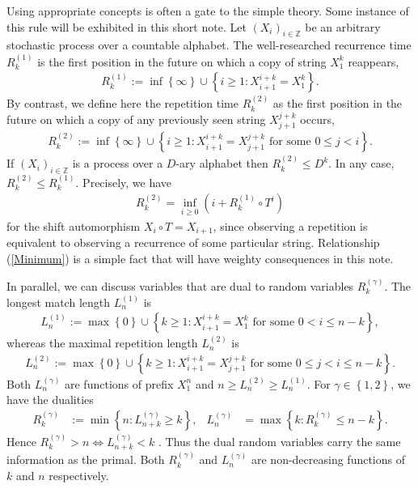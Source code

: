 \documentclass[a4paper]{article}
\newcommand{\okra}[1]{\left( #1 \right)}
\newcommand{\klam}[1]{\left\{ #1 \right\}}
\begin{document}
Using appropriate concepts is often a gate to the simple theory. Some
instance of this rule will be exhibited in this short note.  Let
$(X_i)_{i\in\mathbb{Z}}$ be an arbitrary stochastic process over a
countable alphabet. The well-researched recurrence time $R^{(1)}_k$
\citep{Kac47,WynerZiv89,OrnsteinWeiss93,Kontoyiannis98,Ko12} is the
first position in the future on which a copy of string $X_1^k$
reappears,
\begin{align}
  R^{(1)}_k:=\inf\klam{\infty}\cup\klam{i\ge 1: X_{i+1}^{i+k}=X_1^k}.
\end{align}
By contrast, we define here the repetition time $R^{(2)}_k$ as the
first position in the future on which a copy of any previously seen
string $X_{j+1}^{j+k}$ occurs,
\begin{align}
  R^{(2)}_k:=\inf\klam{\infty}\cup\klam{i\ge 1:
  X_{i+1}^{i+k}=X_{j+1}^{j+k}\text{ for some } 0\le j<i}.
\end{align}
If $(X_i)_{i\in\mathbb{Z}}$ is a process over a $D$-ary alphabet then
$R^{(2)}_k\le D^k$. In any case, $R^{(2)}_k\le R^{(1)}_k$. Precisely,
we have
\begin{align}
  \label{Minimum}
  R^{(2)}_k=\inf_{i\ge 0}\okra{i+R^{(1)}_k\circ T^i}
\end{align}
for the shift automorphism $X_i\circ T=X_{i+1}$, since observing a
repetition is equivalent to observing a recurrence of some particular
string. Relationship (\ref{Minimum}) is a simple fact that will have
weighty consequences in this note.

In parallel, we can discuss variables that are dual to random
variables $R^{(\gamma)}_k$. The longest match length $L^{(1)}_n$
\citep{WynerZiv89,OrnsteinWeiss93,Szpankowski93,
  KontoyiannisOthers98,GaoKontoyiannisBienenstock08}
is
\begin{align}
  L^{(1)}_n:=\max\klam{0}\cup\klam{k\ge 1: X_{i+1}^{i+k}=X_1^k
  \text{ for some } 0< i\le n-k},
\end{align}
whereas the maximal repetition length $L^{(2)}_n$
\citep{DeLuca99,KolpakovKucherov99a,KolpakovKucherov99,CrochemoreIlie08,
  ErdosRenyi70,ArratiaWaterman89,Shields92b,Shields97,
  Szpankowski93,Szpankowski93a,KontoyiannisSuhov94,
  Debowski11b,Debowski17,Debowski18b} is
\begin{align}
  L^{(2)}_n:=\max\klam{0}\cup\klam{k\ge 1: X_{i+1}^{i+k}=X_{j+1}^{j+k}
  \text{ for some } 0\le j< i\le n-k}.
\end{align}
Both $L^{(\gamma)}_n$ are functions of prefix $X_1^n$ and
$n\ge L^{(2)}_n\ge L^{(1)}_n$. For $\gamma\in\klam{1,2}$, we have the
dualities
\begin{align}
  R^{(\gamma)}_k&:=\min\klam{n: L^{(\gamma)}_{n+k}\ge k},
  &
    L^{(\gamma)}_n&=\max\klam{k: R^{(\gamma)}_k\le n-k}.
\end{align}
Hence $R^{(\gamma)}_k>n\iff L^{(\gamma)}_{n+k}<k$
\citep{WynerZiv89}. Thus the dual random variables carry the same
information as the primal. Both $R^{(\gamma)}_k$ and $L^{(\gamma)}_n$
are non-decreasing functions of $k$ and $n$ respectively.
\end{document}
